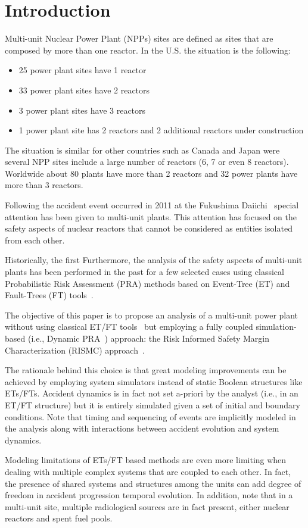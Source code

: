 \section{Introduction}
\label{sec:introduction}

Multi-unit Nuclear Power Plant (NPPs) sites are defined as sites that are composed by 
more than one reactor. In the U.S. the situation is the following:
\begin{itemize}
  \item 25 power plant sites have 1 reactor
  \item 33 power plant sites have 2 reactors
  \item 3 power plant sites have 3 reactors
  \item 1 power plant site has 2 reactors and 2 additional reactors under construction
\end{itemize}
The situation is similar for other countries such as Canada and Japan were 
several NPP sites include a large number of reactors (6, 7 or even 8 reactors). 
Worldwide about 80 plants have more than 2 reactors and 32 power plants have more 
than 3 reactors. 

Following the accident event occurred in 2011 at the Fukushima Daiichi~\cite{Fukushima} special 
attention has been given to multi-unit plants. This attention has focused on the 
safety aspects of nuclear reactors that cannot be considered as entities isolated 
from each other. 

Historically, the first 
Furthermore, the analysis of the safety aspects of multi-unit plants has been performed 
in the past for a few selected cases using classical Probabilistic Risk Assessment (PRA) methods 
based on Event-Tree (ET) and Fault-Trees (FT) 
tools~\cite{MultiUnitKumara,MultiUnitModarres,MultiUnitZhang}. 

The objective of this paper is to propose an analysis of a multi-unit power 
plant without using classical ET/FT tools~\cite{Nureg1150} but employing a fully 
coupled simulation-based (i.e., Dynamic PRA~\cite{DynamicReliabilityMonteCarlo}) approach: 
the Risk Informed Safety Margin Characterization (RISMC) approach~\cite{RISMC,mandelliNewAlgo}. 

The rationale behind this choice is that great modeling improvements can be achieved by 
employing system simulators instead of static Boolean structures like ETs/FTs. 
Accident dynamics is in fact not set a-priori by the analyst (i.e., in an ET/FT 
structure) but it is entirely simulated given a set of initial and boundary conditions. 
Note that timing and sequencing of events are implicitly modeled in the analysis along 
with interactions between accident evolution and system dynamics.

Modeling limitations of ETs/FT based methods are even more limiting when dealing with 
multiple complex systems that are coupled to each other. In fact, the presence of shared 
systems and structures among the units can add degree of freedom in accident progression 
temporal evolution.
In addition, note that in a multi-unit site, multiple radiological sources are in fact present, 
either nuclear reactors and spent fuel pools. 
 



